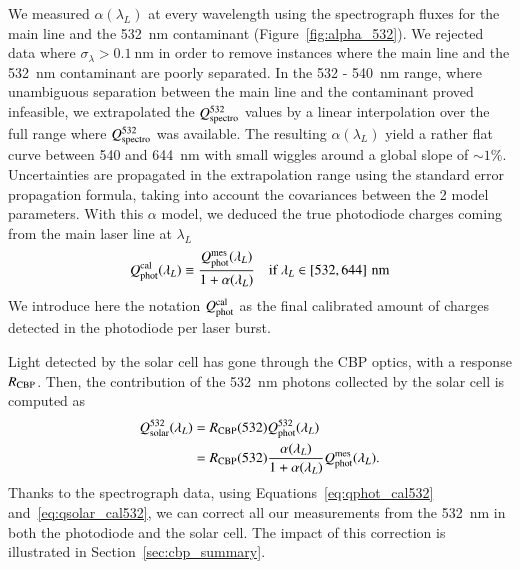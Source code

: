 We measured $\alpha(\lambda_L)$ at every wavelength using the spectrograph fluxes for the main line and the \SI{532}{nm} contaminant (Figure~\ref{fig:alpha_532}). We rejected data where $\sigma_{\lambda} > \SI{0.1}{\nm}$ in order to remove instances where the main line and the \SI{532}{nm} contaminant are poorly separated. In the 532 - \SI{540}{nm} range, where unambiguous separation between the main line and the contaminant proved infeasible, we extrapolated the $Q_{\mathrm{spectro}}^{532}$ values by a linear interpolation over the full range where $Q_{\mathrm{spectro}}^{532}$ was available.
The resulting $\alpha(\lambda_L)$ yield a rather flat curve between 540 and \SI{644}{\nm} with small wiggles around a global slope of $\sim 1\% $.
Uncertainties are propagated in the extrapolation range using the standard error propagation formula, taking into account the covariances between the 2 model parameters. With this $\alpha$ model, we deduced the true photodiode charges coming from the main laser line at $\lambda_L$
\begin{equation}
        Q_{\mathrm{phot}}^{\mathrm{cal}}(\lambda_L) \equiv  \frac{Q_{\mathrm{phot}}^{\mathrm{mes}}(\lambda_L)}{1 + \alpha(\lambda_L)} \quad\text{if}\ \lambda_L \in \left[532, 644\right]\mathrm{\,nm}\label{eq:qphot_cal532}
\end{equation}
We introduce here the notation $Q_{\mathrm{phot}}^{\mathrm{cal}}$ as the final calibrated amount of charges detected in the photodiode per laser burst. 

Light detected by the solar cell has gone through the CBP optics, with a response $R_{\mathrm{CBP}}$.
Then, the contribution of the \SI{532}{\nano\meter} photons collected by the solar cell is computed as
\begin{equation}
\begin{aligned}
    Q_{\mathrm{solar}}^{532}(\lambda_L) & = R_{\mathrm{CBP}}(532)  Q_{\mathrm{phot}}^{532}(\lambda_L) \\ 
    & = R_{\mathrm{CBP}}(532) \frac{ \alpha(\lambda_L) }{1+ \alpha(\lambda_L)} Q_{\mathrm{phot}}^{\mathrm{mes}}(\lambda_L).
    \label{eq:qsolar_cal532}
\end{aligned}
\end{equation}
Thanks to the spectrograph data, using Equations~\ref{eq:qphot_cal532} and~\ref{eq:qsolar_cal532}, we can correct all our measurements from the \SI{532}{\nano\meter} in both the photodiode and the solar cell. The impact of this correction is illustrated in Section~\ref{sec:cbp_summary}.


